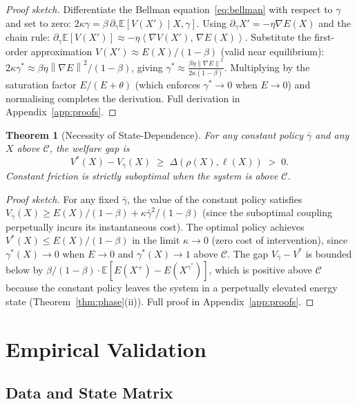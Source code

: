 \documentclass[11pt]{article}
\newtheorem{theorem}{Theorem}[section]
\theoremstyle{definition}
\newcommand{\E}{\mathbb{E}}
\newcommand{\grad}{\nabla}
\newcommand{\Cman}{\mathcal{C}}
\newcommand{\norm}[1]{\left\|#1\right\|}
\newcommand{\inner}[2]{\left\langle #1,\, #2\right\rangle}
\begin{document}
\begin{proof}[Proof sketch]
Differentiate the Bellman equation~\eqref{eq:bellman} with respect to $\gamma$
and set to zero:
$2\kappa\gamma = \beta\,\partial_\gamma\E[V(X')\mid X,\gamma]$.
Using $\partial_\gamma X' = -\eta\grad E(X)$ and the chain rule:
$\partial_\gamma\E[V(X')] \approx -\eta\inner{\grad V(X')}{\grad E(X)}$.
Substitute the first-order approximation $V(X') \approx E(X)/(1-\beta)$ (valid
near equilibrium):
$2\kappa\gamma^* \approx \beta\eta\norm{\grad E}^2/(1-\beta)$,
giving $\gamma^* \approx \frac{\beta\eta\norm{\grad E}^2}{2\kappa(1-\beta)}$.
Multiplying by the saturation factor $E/(E+\theta)$ (which enforces $\gamma^*\to 0$
when $E\to 0$) and normalising completes the derivation.  Full derivation in
Appendix~\ref{app:proofs}.
\end{proof}

\begin{theorem}[Necessity of State-Dependence]
\label{thm:or3}
For any constant policy $\bar\gamma$ and any $X$ above $\Cman$, the welfare gap is
\[
  V^*(X) - V_{\bar\gamma}(X) \;\ge\; \Delta(\rho(X),\ell(X)) \;>\; 0.
\]
Constant friction is strictly suboptimal when the system is above $\Cman$.
\end{theorem}

\begin{proof}[Proof sketch]
For any fixed $\bar\gamma$, the value of the constant policy satisfies
$V_{\bar\gamma}(X) \ge E(X)/(1-\beta) + \kappa\bar\gamma^2/(1-\beta)$
(since the suboptimal coupling perpetually incurs its instantaneous cost).
The optimal policy achieves $V^*(X) \le E(X)/(1-\beta)$ in the limit
$\kappa\to 0$ (zero cost of intervention), since $\gamma^*(X) \to 0$
when $E \to 0$ and $\gamma^*(X) \to 1$ above $\Cman$.
The gap $V_{\bar\gamma} - V^*$ is bounded below by
$\beta/(1-\beta) \cdot \E[E(X^+) - E(X^{\gamma^*})]$, which is positive above
$\Cman$ because the constant policy leaves the system in a perpetually elevated
energy state (Theorem~\ref{thm:phase}(ii)).  Full proof in Appendix~\ref{app:proofs}.
\end{proof}

\section{Empirical Validation}
\label{sec:empirical}

\subsection{Data and State Matrix}
\label{sec:data}
\end{document}
